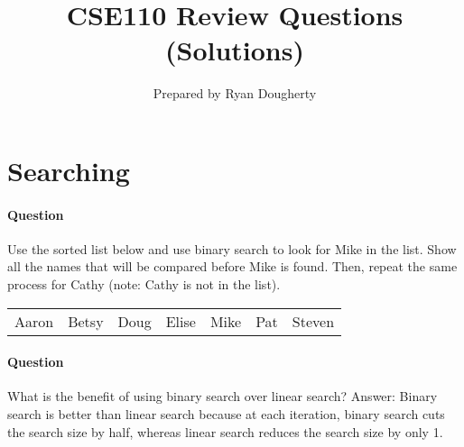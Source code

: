 \documentclass{article}
\title{CSE110 Review Questions (Solutions)}
\author{Prepared by Ryan Dougherty}
\date{}
\begin{document}
\maketitle

\section*{Searching}


\setcounter{question_num}{1}
\paragraph{Question }
Use the sorted list below and use binary search to look for Mike in the list. Show all the names that will be compared before Mike is found. Then, repeat the same process for Cathy (note: Cathy is not in the list).
\begin{table}[h]
\begin{tabular}{lllllll}
Aaron & Betsy & Doug & Elise & Mike & Pat & Steven
\end{tabular}
\end{table}

\addtocounter{question_num}{1}
\paragraph{Question }
What is the benefit of using binary search over linear search? {\color{red}Answer: Binary search is better than linear search because at each iteration, binary search cuts the search size by half, whereas linear search reduces the search size by only 1.}
\end{document}
